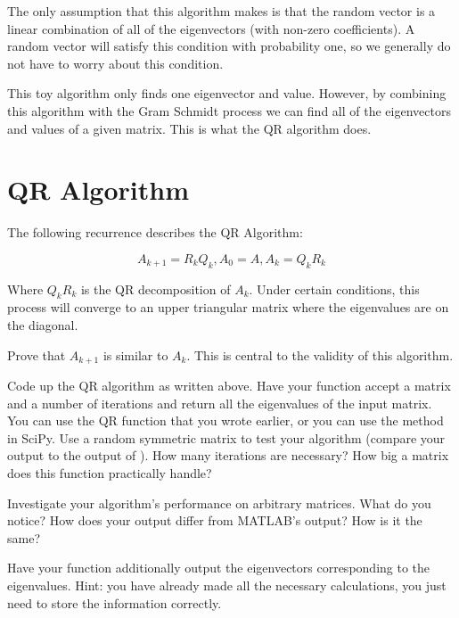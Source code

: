The only assumption that this algorithm makes is that the random vector is a linear combination of all of the eigenvectors (with non-zero coefficients). A random vector will satisfy this condition with probability one, so we generally do not have to worry about this condition. 

This toy algorithm only finds one eigenvector and value. However, by combining this algorithm with the Gram Schmidt process we can find all of the eigenvectors and values of a given matrix. This is what the QR algorithm does.

\section*{QR Algorithm}

The following recurrence describes the QR Algorithm:

\[
A_{k+1} = R_k Q_k, A_0 = A, A_k = Q_k R_k
\]

Where $Q_kR_k$ is the QR decomposition of $A_k$. Under certain conditions, this process will converge to an upper triangular matrix where the eigenvalues are on the diagonal.

\begin{problem}
Prove that $A_{k+1}$ is similar to $A_k$. This is central to the validity of this algorithm.
\end{problem}

\begin{problem}
Code up the QR algorithm as written above. Have your function accept a matrix and a number of iterations and return all the eigenvalues of the input matrix. You can use the QR function that you wrote earlier, or you can use the  method in SciPy. Use a random symmetric matrix to test your algorithm (compare your output to the output of ). How many iterations are necessary? How big a matrix does this function practically handle?
\end{problem}

\begin{problem}
Investigate your algorithm's performance on arbitrary matrices. What do you notice? How does your output differ from MATLAB's output? How is it the same?
\end{problem}

\begin{problem}
Have your function additionally output the eigenvectors corresponding to the eigenvalues. Hint: you have already made all the necessary calculations, you just need to store the information correctly.
\end{problem}

